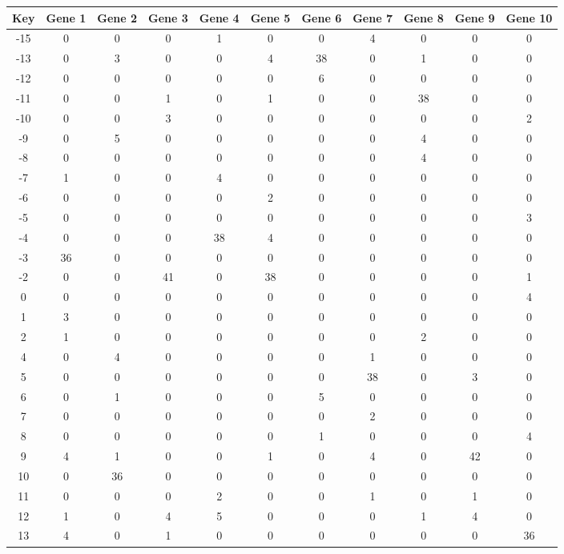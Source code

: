 \begin{tabular}{|c|c|c|c|c|c|c|c|c|c|c|}
\hline
Key & Gene 1 & Gene 2 & Gene 3 & Gene 4 & Gene 5 & Gene 6 & Gene 7 & Gene 8 & Gene 9 & Gene 10 \\
\hline
-15 & 0 & 0 & 0 & 1 & 0 & 0 & 4 & 0 & 0 & 0 \\
-13 & 0 & 3 & 0 & 0 & 4 & 38 & 0 & 1 & 0 & 0 \\
-12 & 0 & 0 & 0 & 0 & 0 & 6 & 0 & 0 & 0 & 0 \\
-11 & 0 & 0 & 1 & 0 & 1 & 0 & 0 & 38 & 0 & 0 \\
-10 & 0 & 0 & 3 & 0 & 0 & 0 & 0 & 0 & 0 & 2 \\
-9 & 0 & 5 & 0 & 0 & 0 & 0 & 0 & 4 & 0 & 0 \\
-8 & 0 & 0 & 0 & 0 & 0 & 0 & 0 & 4 & 0 & 0 \\
-7 & 1 & 0 & 0 & 4 & 0 & 0 & 0 & 0 & 0 & 0 \\
-6 & 0 & 0 & 0 & 0 & 2 & 0 & 0 & 0 & 0 & 0 \\
-5 & 0 & 0 & 0 & 0 & 0 & 0 & 0 & 0 & 0 & 3 \\
-4 & 0 & 0 & 0 & 38 & 4 & 0 & 0 & 0 & 0 & 0 \\
-3 & 36 & 0 & 0 & 0 & 0 & 0 & 0 & 0 & 0 & 0 \\
-2 & 0 & 0 & 41 & 0 & 38 & 0 & 0 & 0 & 0 & 1 \\
0 & 0 & 0 & 0 & 0 & 0 & 0 & 0 & 0 & 0 & 4 \\
1 & 3 & 0 & 0 & 0 & 0 & 0 & 0 & 0 & 0 & 0 \\
2 & 1 & 0 & 0 & 0 & 0 & 0 & 0 & 2 & 0 & 0 \\
4 & 0 & 4 & 0 & 0 & 0 & 0 & 1 & 0 & 0 & 0 \\
5 & 0 & 0 & 0 & 0 & 0 & 0 & 38 & 0 & 3 & 0 \\
6 & 0 & 1 & 0 & 0 & 0 & 5 & 0 & 0 & 0 & 0 \\
7 & 0 & 0 & 0 & 0 & 0 & 0 & 2 & 0 & 0 & 0 \\
8 & 0 & 0 & 0 & 0 & 0 & 1 & 0 & 0 & 0 & 4 \\
9 & 4 & 1 & 0 & 0 & 1 & 0 & 4 & 0 & 42 & 0 \\
10 & 0 & 36 & 0 & 0 & 0 & 0 & 0 & 0 & 0 & 0 \\
11 & 0 & 0 & 0 & 2 & 0 & 0 & 1 & 0 & 1 & 0 \\
12 & 1 & 0 & 4 & 5 & 0 & 0 & 0 & 1 & 4 & 0 \\
13 & 4 & 0 & 1 & 0 & 0 & 0 & 0 & 0 & 0 & 36 \\
\hline
\end{tabular}